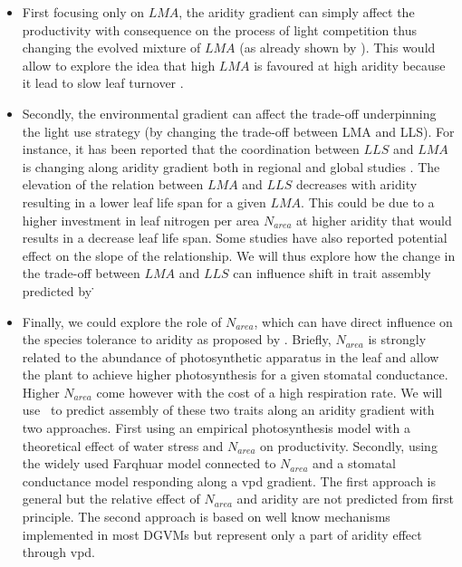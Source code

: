 \documentclass[a4paper,11pt]{article}
\begin{document}
\begin{itemize}

\item First focusing only on $LMA$, the aridity gradient can simply affect
the productivity with consequence on the process of light
competition thus changing the evolved mixture of $LMA$ (as already shown by \citep{Falster-2017}). This would allow to explore the idea that high $LMA$ is favoured at high aridity because it lead to slow leaf turnover \citep{Wright-2002b}.

\item Secondly, the environmental gradient can affect the
trade-off underpinning the light use strategy (by changing the
trade-off between LMA and LLS). For instance, it has been reported
that the coordination between $LLS$ and $LMA$ is changing along
aridity gradient both in regional \citep{Wright-2002b} and global
studies \citep{Wright-2004}. The elevation of the relation between
$LMA$ and $LLS$ decreases with aridity resulting in a lower leaf life
span for a given $LMA$. This could be due to a higher
investment in leaf nitrogen per area $N_{area}$ at higher aridity
\citep{Wright-2002b} that would results in a decrease leaf life span. Some studies have also reported potential
effect on the slope of the relationship. We will thus explore how the
change in the trade-off between $LMA$ and $LLS$ can influence shift in
trait assembly predicted by \plant\.

\item Finally, we could explore the role of $N_{area}$, which can have
  direct influence on the species tolerance to aridity as proposed by
  \citet{Wright-2003}. Briefly, $N_{area}$ is strongly related to the
  abundance of photosynthetic apparatus in the leaf and allow the
  plant to achieve higher photosynthesis for a given stomatal
  conductance. Higher $N_{area}$ come however with the cost of a high
  respiration rate. We will use \plant\ to predict assembly of these
  two traits along an aridity gradient with two approaches. First
  using an empirical photosynthesis model with a theoretical effect of
  water stress and $N_{area}$ on productivity. Secondly, using the
  widely used Farqhuar model connected to $N_{area}$ and a stomatal
  conductance model responding along a vpd gradient. The first
  approach is general but the relative effect of $N_{area}$ and
  aridity are not predicted from first principle. The second approach
  is based on well know mechanisms implemented in most DGVMs but
  represent only a part of aridity effect through vpd.


\end{itemize}
\end{document}
